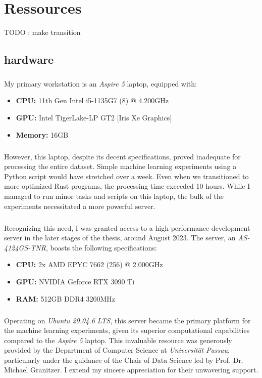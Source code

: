 \chapter{Ressources}\label{chap:ressources}

TODO : make transition

\section{hardware}
\paragraph{}My primary workstation is an \textit{Aspire 5} laptop, equipped with:
\begin{itemize}
    \item \textbf{CPU:} 11th Gen Intel i5-1135G7 (8) @ 4.200GHz 
    \item \textbf{GPU:} Intel TigerLake-LP GT2 [Iris Xe Graphics]
    \item \textbf{Memory:} 16GB
\end{itemize}
\paragraph{}However, this laptop, despite its decent specifications, proved inadequate for processing the entire dataset. Simple machine learning experiments using a Python script would have stretched over a week. Even when we transitioned to more optimized Rust programs, the processing time exceeded 10 hours. While I managed to run minor tasks and scripts on this laptop, the bulk of the experiments necessitated a more powerful server.

\paragraph{}Recognizing this need, I was granted access to a high-performance development server in the later stages of the thesis, around August 2023. The server, an \textit{AS-4124GS-TNR}, boasts the following specifications:
\begin{itemize}
    \item \textbf{CPU:} 2x AMD EPYC 7662 (256) @ 2.000GHz
    \item \textbf{GPU:} NVIDIA Geforce RTX 3090 Ti
    \item \textbf{RAM:} 512GB DDR4 3200MHz
\end{itemize}
\paragraph{}Operating on \textit{Ubuntu 20.04.6 LTS}, this server became the primary platform for the machine learning experiments, given its superior computational capabilities compared to the \textit{Aspire 5} laptop. This invaluable resource was generously provided by the Department of Computer Science at \textit{Universität Passau}, particularly under the guidance of the Chair of Data Science led by Prof. Dr. Michael Granitzer. I extend my sincere appreciation for their unwavering support.


